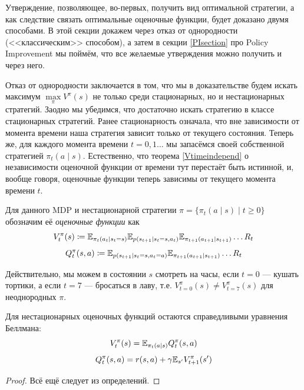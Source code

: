 Утверждение, позволяющее, во-первых, получить вид оптимальной стратегии, а как следствие связать оптимальные оценочные функции, будет доказано двумя способами. В этой секции докажем через отказ от однородности (<<классическим>> способом), а затем в секции \ref{PIsection} про Policy Improvement мы поймём, что все желаемые утверждения можно получить и через него.

Отказ от однородности заключается в том, что мы в доказательстве будем искать максимум $\max\limits_\pi V^\pi(s)$ не только среди стационарных, но и нестационарных стратегий. Заодно мы убедимся, что достаточно искать стратегию в классе стационарных стратегий. Ранее стационарность означала, что вне зависимости от момента времени наша стратегия зависит только от текущего состояния. Теперь же, для каждого момента времени $t = 0, 1 \dots$ мы запасёмся своей собственной стратегией $\pi_t(a \mid s)$. Естественно, что теорема \ref{Vtimeindepend} о независимости оценочной функции от времени тут перестаёт быть истинной, и, вообще говоря, оценочные функции теперь зависимы от текущего момента времени $t$. 

\begin{definition}
Для данного MDP и нестационарной стратегии $\pi = \{ \pi_t(a \mid s) \mid t \ge 0 \}$ обозначим её \emph{оценочные функции} как 
$$V^\pi_t(s) \coloneqq \mathbb{E}_{\pi_t(a_t \mid s_t = s)}\mathbb{E}_{p(s_{t+1} \mid s_t=s, a_t)}\mathbb{E}_{\pi_{t+1}(a_{t+1} \mid s_{t+1})} \dots R_t$$
$$Q^\pi_t(s, a) \coloneqq \mathbb{E}_{p(s_{t+1} \mid s_t=s, a_t=a)}\mathbb{E}_{\pi_{t+1}(a_{t+1} \mid s_{t+1})} \dots R_t$$
\end{definition}

\begin{example}
Действительно, мы можем в состоянии $s$ смотреть на часы, если $t=0$ --- кушать тортики, а если $t=7$ --- бросаться в лаву, т.е. $V^{\pi}_{t=0}(s) \ne V^{\pi}_{t=7}(s)$ для неоднородных $\pi$.
\end{example}

\begin{proposition}
Для нестационарных оценочных функций остаются справедливыми уравнения Беллмана:
\begin{equation}\label{VQ_nonstat}
V^\pi_t(s) = \mathbb{E}_{\pi_t(a \mid s)} Q^\pi_t(s, a)
\end{equation}
\begin{equation}\label{QV_nonstat}
Q^\pi_t(s, a) = r(s, a) + \gamma \mathbb{E}_{s'} V^\pi_{t+1}(s')
\end{equation}
\begin{proof}
Всё ещё следует из определений.
\end{proof}
\end{proposition}

